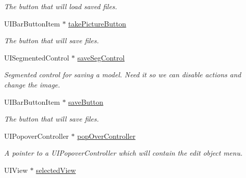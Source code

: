 \begin{DoxyCompactItemize}
\begin{DoxyCompactList}\small\item\em The button that will load saved files. \end{DoxyCompactList}\item 
\hypertarget{interface_model_section_view_controller_a21477dfcf454e9177d5fb3bd04b389e9}{U\-I\-Bar\-Button\-Item $\ast$ \hyperlink{interface_model_section_view_controller_a21477dfcf454e9177d5fb3bd04b389e9}{take\-Picture\-Button}}\label{interface_model_section_view_controller_a21477dfcf454e9177d5fb3bd04b389e9}

\begin{DoxyCompactList}\small\item\em The button that will save files. \end{DoxyCompactList}\item 
\hypertarget{interface_model_section_view_controller_a1e94870fc426dba899cad9070651e562}{U\-I\-Segmented\-Control $\ast$ \hyperlink{interface_model_section_view_controller_a1e94870fc426dba899cad9070651e562}{save\-Seg\-Control}}\label{interface_model_section_view_controller_a1e94870fc426dba899cad9070651e562}

\begin{DoxyCompactList}\small\item\em Segmented control for saving a model. Need it so we can disable actions and change the image. \end{DoxyCompactList}\item 
\hypertarget{interface_model_section_view_controller_a30e5aecd252bb0cf8095e3d435b07b29}{U\-I\-Bar\-Button\-Item $\ast$ \hyperlink{interface_model_section_view_controller_a30e5aecd252bb0cf8095e3d435b07b29}{save\-Button}}\label{interface_model_section_view_controller_a30e5aecd252bb0cf8095e3d435b07b29}

\begin{DoxyCompactList}\small\item\em The button that will save files. \end{DoxyCompactList}\item 
\hypertarget{interface_model_section_view_controller_a4f6ad6ee733bbd0760d2825f6a5ce9f4}{U\-I\-Popover\-Controller $\ast$ \hyperlink{interface_model_section_view_controller_a4f6ad6ee733bbd0760d2825f6a5ce9f4}{pop\-Over\-Controller}}\label{interface_model_section_view_controller_a4f6ad6ee733bbd0760d2825f6a5ce9f4}

\begin{DoxyCompactList}\small\item\em A pointer to a U\-I\-Popover\-Controller which will contain the edit object menu. \end{DoxyCompactList}\item 
\hypertarget{interface_model_section_view_controller_a7d349fc947db08dd56690582423a4b1b}{U\-I\-View $\ast$ \hyperlink{interface_model_section_view_controller_a7d349fc947db08dd56690582423a4b1b}{selected\-View}}\label{interface_model_section_view_controller_a7d349fc947db08dd56690582423a4b1b}


\end{DoxyCompactItemize}
